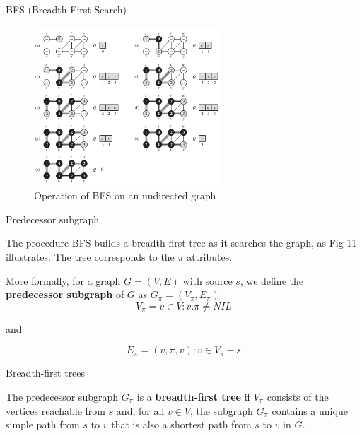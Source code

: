 \documentclass[ignorenonframetext,]{beamer}
\begin{document}
\begin{frame}{BFS (Breadth-First Search)}
\protect\hypertarget{bfs-breadth-first-search-2}{}

\begin{figure}
\centering
\includegraphics[width=\textwidth,height=2.34375in]{bfs-undirected-graph.png}
\caption{Operation of BFS on an undirected graph}
\end{figure}

\end{frame}

\begin{frame}{Predecessor subgraph}
\protect\hypertarget{predecessor-subgraph}{}

The procedure BFS builds a breadth-ﬁrst tree as it searches the graph,
as Fig-11 illustrates. The tree corresponds to the \(\pi\) attributes.

More formally, for a graph \(G = (V, E)\) with source \(s\), we deﬁne
the \textbf{predecessor subgraph} of \(G\) as
\(G_{\pi} = (V_{\pi}, E_{\pi})\) \[
V_{\pi} = { v \in V : v.\pi \ne NIL }
\]

and

\[
E_{\pi} = { (v, \pi, v) : v \in V_{\pi} - {s} }
\]

\end{frame}

\begin{frame}{Breadth-first trees}
\protect\hypertarget{breadth-first-trees}{}

The predecessor subgraph \(G_{\pi}\) is a \textbf{breadth-ﬁrst tree} if
\(V_{\pi}\) consists of the vertices reachable from \(s\) and, for all
\(v \in V\), the subgraph \(G_{\pi}\) contains a unique simple path from
\(s\) to \(v\) that is also a shortest path from \(s\) to \(v\) in
\(G\).

\end{frame}
\end{document}

